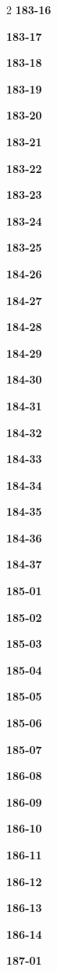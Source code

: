 \documentclass[10pt,a4paper]{article}
\begin{document}
\begin{multicols}{2}
\noindent\textbf{183-16}\ \par
\noindent\textbf{183-17}\ \par
\noindent\textbf{183-18}\ \par
\noindent\textbf{183-19}\ \par
\noindent\textbf{183-20}\ \par
\noindent\textbf{183-21}\ \par
\noindent\textbf{183-22}\ \par
\noindent\textbf{183-23}\ \par
\noindent\textbf{183-24}\ \par
\noindent\textbf{183-25}\ \par
\noindent\textbf{184-26}\ \par
\noindent\textbf{184-27}\ \par
\noindent\textbf{184-28}\ \par
\noindent\textbf{184-29}\ \par
\noindent\textbf{184-30}\ \par
\noindent\textbf{184-31}\ \par
\noindent\textbf{184-32}\ \par
\noindent\textbf{184-33}\ \par
\noindent\textbf{184-34}\ \par
\noindent\textbf{184-35}\ \par
\noindent\textbf{184-36}\ \par
\noindent\textbf{184-37}\ \par
\noindent\textbf{185-01}\ \par
\noindent\textbf{185-02}\ \par
\noindent\textbf{185-03}\ \par
\noindent\textbf{185-04}\ \par
\noindent\textbf{185-05}\ \par
\noindent\textbf{185-06}\ \par
\noindent\textbf{185-07}\ \par
\noindent\textbf{186-08}\ \par
\noindent\textbf{186-09}\ \par
\noindent\textbf{186-10}\ \par
\noindent\textbf{186-11}\ \par
\noindent\textbf{186-12}\ \par
\noindent\textbf{186-13}\ \par
\noindent\textbf{186-14}\ \par
\noindent\textbf{187-01}\ \par

\end{multicols}
\end{document}
